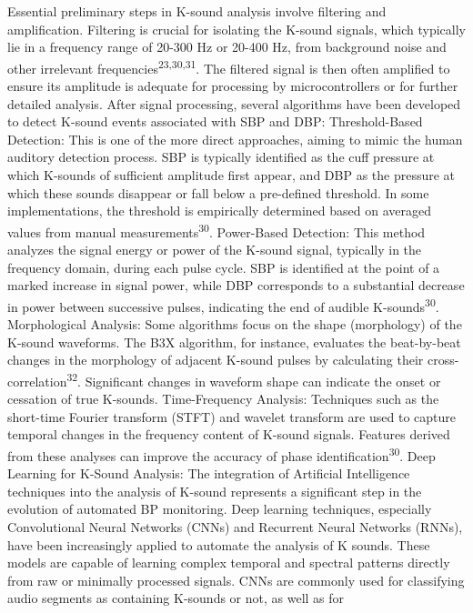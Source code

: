 \documentclass[
  12pt,
  letterpaper,
  openany,
  oneside]{book}
\begin{document}
Essential preliminary steps in K-sound analysis involve filtering and
amplification. Filtering is crucial for isolating the K-sound signals,
which typically lie in a frequency range of 20-300 Hz or 20-400 Hz, from
background noise and other irrelevant
frequencies\textsuperscript{23,30,31}. The filtered signal is then often
amplified to ensure its amplitude is adequate for processing by
microcontrollers or for further detailed analysis. After signal
processing, several algorithms have been developed to detect K-sound
events associated with SBP and DBP: Threshold-Based Detection: This is
one of the more direct approaches, aiming to mimic the human auditory
detection process. SBP is typically identified as the cuff pressure at
which K-sounds of sufficient amplitude first appear, and DBP as the
pressure at which these sounds disappear or fall below a pre-defined
threshold. In some implementations, the threshold is empirically
determined based on averaged values from manual
measurements\textsuperscript{30}. Power-Based Detection: This method
analyzes the signal energy or power of the K-sound signal, typically in
the frequency domain, during each pulse cycle. SBP is identified at the
point of a marked increase in signal power, while DBP corresponds to a
substantial decrease in power between successive pulses, indicating the
end of audible K-sounds\textsuperscript{30}. Morphological Analysis:
Some algorithms focus on the shape (morphology) of the K-sound
waveforms. The B3X algorithm, for instance, evaluates the beat-by-beat
changes in the morphology of adjacent K-sound pulses by calculating
their cross-correlation\textsuperscript{32}. Significant changes in
waveform shape can indicate the onset or cessation of true K-sounds.
Time-Frequency Analysis: Techniques such as the short-time Fourier
transform (STFT) and wavelet transform are used to capture temporal
changes in the frequency content of K-sound signals. Features derived
from these analyses can improve the accuracy of phase
identification\textsuperscript{30}. Deep Learning for K-Sound Analysis:
The integration of Artificial Intelligence techniques into the analysis
of K-sound represents a significant step in the evolution of automated
BP monitoring. Deep learning techniques, especially Convolutional Neural
Networks (CNNs) and Recurrent Neural Networks (RNNs), have been
increasingly applied to automate the analysis of K sounds. These models
are capable of learning complex temporal and spectral patterns directly
from raw or minimally processed signals. CNNs are commonly used for
classifying audio segments as containing K-sounds or not, as well as for
\end{document}
